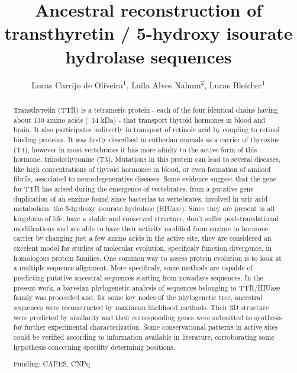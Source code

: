 \documentclass[twoside]{article}
\title{\vspace{-15mm}\fontsize{24pt}{10pt}\selectfont\textbf{Ancestral reconstruction of transthyretin / 5-hydroxy isourate hydrolase sequences}} %
\author{Lucas Carrijo de Oliveira$^1$, Laila Alves Nahum$^2$, Lucas Bleicher$^1$}
\affil{1 UFMG\\ 2 CPQRR/FIOCRUZ MINAS\\ }
\date{}
\begin{document}
\maketitle %

\thispagestyle{fancy} %


\begin{abstract}
Transthyretin (TTR) is a tetrameric protein - each of the four identical chains having about 130 amino acids (~14 kDa) -  that transport thyroid hormones in blood and brain. It also participates indirectly in transport of retinoic acid by coupling to retinol binding proteins. It was firstly described in eutherian mamals as a carrier of thyroxine (T4), however in most vertebrates it has more afinity to the active form of this hormone, triiodothyronine (T3). Mutations in this protein can lead to several diseases, like high concentrations of thyroid hormones in blood, or even formation of amiloid fibrils, associated to neurodegenerative diseases. Some evidence suggest that the gene for TTR has arised during the emergence of vertebrates, from a putative gene duplication of an enzime found since bacterias to vertebrates, involved in uric acid metabolism: the 5-hydroxy isourate hydrolase (HIUase). Since they are present in all kingdoms of life, have a stable and conserved structure, don't suffer post-translational modifications and are able to have their activity modified from enzime to hormone carrier by changing just a few amino acids in the active site, they are considered an excelent model for studies of molecular evolution, specificaly function divergence, in homologous protein families. One common way to assess protein evolution is to look at a multiple sequence alignment. More specificaly, some methods are capable of predicting putative ancestral sequences starting from nowadays sequences. In the present work, a bayesian phylogenetic analysis of sequences belonging to TTR/HIUase family was proceeded and, for some key nodes of the phylogenetic tree, ancestral sequences were reconstructed by maximum likelihood methods. Their 3D structure were predicted by similarity and their corresponding genes were submitted to synthesis for further experimental characterization. Some conservational patterns in active sites could be verified according to information available in literature, corroborating some hypothesis concerning specifity determinig positions.

Funding: CAPES, CNPq
\end{abstract}
\end{document}
